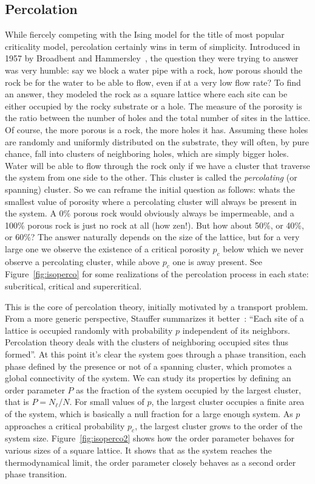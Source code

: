 \subsection{Percolation}
\label{sec:perc}

While fiercely competing with the Ising model for the title of most popular
criticality model, percolation certainly wins in term of simplicity. Introduced
in 1957 by Broadbent and Hammersley~\cite{Broadbent1957}, the question they
were trying to answer was very humble: say we block a water pipe with a rock,
how porous should the rock be for the water to be able to flow, even if at a
very low flow rate? To find an answer, they modeled the rock as a square
lattice where each site can be either occupied by the rocky substrate or a
hole. The measure of the porosity is the ratio between the number of holes and
the total number of sites in the lattice. Of course, the more porous is a rock,
the more holes it has. Assuming these holes are randomly and uniformly
distributed on the substrate, they will often, by pure chance, fall into
clusters of neighboring holes, which are simply bigger holes. Water will be
able to flow through the rock only if we have a cluster that traverse the
system from one side to the other. This cluster is called the
\textit{percolating} (or spanning) cluster. So we can reframe the initial
question as follows: whats the smallest value of porosity where a percolating
cluster will always be present in the system. A 0\% porous rock would obviously
always be impermeable, and a 100\% porous rock is just no rock at all (how
zen!). But how about 50\%, or 40\%, or 60\%? The answer naturally depends on
the size of the lattice, but for a very large one we observe the existence of a
critical porosity $p_c$ below which we never observe a percolating cluster,
while above $p_c$ one is away present. See Figure~\ref{fig:isoperco} for some
realizations of the percolation process in each state: subcritical, critical
and supercritical.

This is the core of percolation theory, initially motivated by a transport
problem. From a more generic perspective, Stauffer summarizes it
better~\cite{Stauffer1994}: ``Each site of a lattice is occupied randomly with
probability $p$ independent of its neighbors. Percolation theory deals with the
clusters of neighboring occupied sites thus formed''. At this point it's clear
the system goes through a phase transition, each phase defined by the presence
or not of a spanning cluster, which promotes a global connectivity of the
system. We can study its properties by defining an order parameter $P$ as the
fraction of the system occupied by the largest cluster, that is $P=N_\ell/N$.
For small values of $p$, the largest cluster occupies a finite area of the
system, which is basically a null fraction for a large enough system. As $p$
approaches a critical probability $p_c$, the largest cluster grows to the order
of the system size. Figure~\ref{fig:isoperco2} shows how the order parameter
behaves for various sizes of a square lattice. It shows that as the system
reaches the thermodynamical limit, the order parameter closely behaves as a
second order phase transition.

